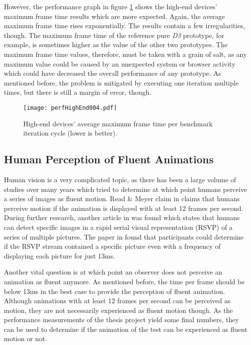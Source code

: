 However, the performance graph in figure \ref{fig:perfHighEnd004} shows the high-end devices' maximum frame time results which are more expected. Again, the average maximum frame time rises exponentially. The results contain a few irregularities, though. The maximum frame time of the reference pure \emph{D3} prototype, for example, is sometimes higher as the value of the other two prototypes. The maximum frame time values, therefore, must be taken with a grain of salt, as any maximum value could be caused by an unexpected system or browser activity which could have decreased the overall performance of any prototype. As mentioned before, the problem is mitigated by executing one iteration multiple times, but there is still a margin of error, though.

\begin{figure}
\centering
\texttt{[image: perfHighEnd004.pdf]}
\caption{High-end devices' average maximum frame time per benchmark iteration cycle (lower is better).}
\label{fig:perfHighEnd004}
\end{figure}

\subsection{Human Perception of Fluent Animations}
\label{sub:humanPerception}


Human vision is a very complicated topic, as there has been a large volume of studies over many years which tried to determine at which point humans perceive a series of images as fluent motion. Read \& Meyer claim in \cite{RestorationOfMotionPictureFilm} claims that humans perceive motion if the animation is displayed with at least 12 frames per second. During further research, another article in \cite{Potter2014} was found which states that humans can detect specific images in a rapid serial visual representation (RSVP) of a series of multiple pictures. The paper in \cite{Potter2014} found that participants could determine if the RSVP stream contained a specific picture even with a frequency of displaying each picture for just 13ms. 

Another vital question is at which point an observer does not perceive an animation as fluent anymore. As mentioned before, the time per frame should be below 13ms in the best case to provide the perception of fluent animation. Although animations with at least 12 frames per second can be perceived as motion, they are not necessarily experienced as fluent motion though. As the performance measurements of the thesis project yield some final numbers, they can be used to determine if the animation of the test can be experienced as fluent motion or not.

